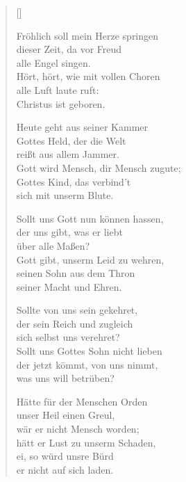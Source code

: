 \begin{multicols}{2}
\settowidth{\versewidth}{Meine Schuld kann mich nicht drücken,}
\begin{verse}[\versewidth]
 
 Fröhlich soll mein Herze springen\\
dieser Zeit, da vor Freud\\
alle Engel singen.\\
Hört, hört, wie mit vollen Choren\\
alle Luft laute ruft:\\
Christus ist geboren.
 
 Heute geht aus seiner Kammer\\
Gottes Held, der die Welt\\
reißt aus allem Jammer.\\
Gott wird Mensch, dir Mensch zugute;\\
Gottes Kind, das verbind't\\
sich mit unserm Blute.
 
 Sollt uns Gott nun können hassen,\\
der uns gibt, was er liebt\\
über alle Maßen?\\
Gott gibt, unserm Leid zu wehren,\\
seinen Sohn aus dem Thron\\
seiner Macht und Ehren.
 
 Sollte von uns sein gekehret,\\
der sein Reich und zugleich\\
sich selbst uns verehret?\\
Sollt uns Gottes Sohn nicht lieben\\
der jetzt kömmt, von uns nimmt,\\
was uns will betrüben?
 
 Hätte für der Menschen Orden\\
unser Heil einen Greul,\\
wär er nicht Mensch worden;\\
hätt er Lust zu unserm Schaden,\\
ei, so würd unsre Bürd\\
er nicht auf sich laden.
 

\end{verse}
\end{multicols}
